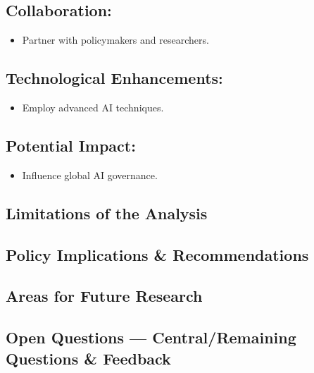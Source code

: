 \documentclass[
  letterpaper,
]{book}
\providecommand{\tightlist}{%
  \setlength{\itemsep}{0pt}\setlength{\parskip}{0pt}}
\begin{document}
\subsection{Collaboration:}\label{collaboration}

\begin{itemize}
\tightlist
\item
  Partner with policymakers and researchers.
\end{itemize}

\subsection{Technological
Enhancements:}\label{technological-enhancements}

\begin{itemize}
\tightlist
\item
  Employ advanced AI techniques.
\end{itemize}

\subsection{Potential Impact:}\label{potential-impact}

\begin{itemize}
\tightlist
\item
  Influence global AI governance.
\end{itemize}

\subsection{Limitations of the
Analysis}\label{limitations-of-the-analysis}

\subsection{Policy Implications \&
Recommendations}\label{policy-implications-recommendations}

\subsection{Areas for Future Research}\label{areas-for-future-research}

\subsection{Open Questions --- Central/Remaining Questions \&
Feedback}\label{open-questions-centralremaining-questions-feedback}
\end{document}
